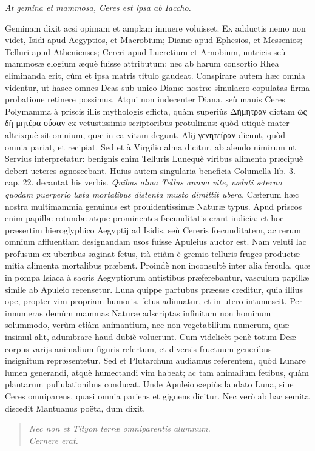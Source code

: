 \documentclass[a4paper, 11pt, oneside, polutonikogreek, latin]{article}
\begin{document}
\emph{At gemina et mammosa, Ceres est ipsa ab Iaccho.}

Geminam dixit acsi opimam et amplam innuere voluisset. Ex adductis nemo non videt, Isidi apud Aegyptios, et Macrobium; Dianæ apud Ephesios, et Messenios; Telluri apud Athenienses; Cereri apud Lucretium et Arnobium, nutricis seù mammosæ elogium æquè fuisse attributum: nec ab harum consortio Rhea eliminanda erit, cùm et ipsa matris titulo gaudeat. Conspirare autem hæc omnia videntur, ut hasce omnes Deas sub unico Dianæ nostræ simulacro copulatas firma probatione retinere possimus. Atqui non indecenter Diana, seù mauis Ceres Polymamma à priscis illis mythologis efficta, quàm superiùs Δήμητραν dictam ὡς δὴ μητέρα οὖσαν ex vetustissimis scriptoribus protulimus: quòd utiquè mater altrixquè sit omnium, quæ in ea vitam degunt. Alij γενητείραν dicunt, quòd omnia pariat, et recipiat. Sed et à Virgilio alma dicitur, ab alendo nimirum ut Servius interpretatur: benignis enim Telluris Lunequè viribus alimenta præcipuè deberi ueteres agnoscebant. Huius autem singularia beneficia Columella lib. 3. cap. 22. decantat his verbis. \emph{Quibus alma Tellus annua vite, væluti æterno quodam puerperio læta mortalibus distenta musto dimittit ubera.} Cæterum hæc nostra multimammia genuinus est prouidentissimæ Naturæ typus. Apud priscos enim papillæ rotundæ atque prominentes fæcunditatis erant indicia: et hoc præsertim hieroglyphico Aegyptij ad Isidis, seù Cereris fœcunditatem, ac rerum omnium affluentiam designandam usos fuisse Apuleius auctor est. Nam veluti lac profusum ex uberibus saginat fetus, ità etiàm è gremio telluris fruges productæ mitia alimenta mortalibus præbent. Proindè non inconsultè inter alia fercula, quæ in pompa Isiaca à sacris Aegyptiorum antistibus præferebantur, vasculum papillæ simile ab Apuleio recensetur. Luna quippe partubus præesse creditur, quia illius ope, propter vim propriam humoris, fetus adiuuatur, et in utero intumescit. Per innumeras demùm mammas Naturæ adscriptas infinitum non hominum solummodo, verùm etiàm animantium, nec non vegetabilium numerum, quæ insimul alit, adumbrare haud dubiè voluerunt. Cum videlicèt penè totum Deæ corpus varijs animalium figuris refertum, et diversis fructuum generibus insignitum repræsentetur. Sed et Plutarchum audiamus referentem, quòd Lunare lumen generandi, atquè humectandi vim habeat; ac tam animalium fetibus, quàm plantarum pullulationibus conducat. Unde Apuleio sæpiùs laudato Luna, siue Ceres omniparens, quasi omnia pariens et gignens dicitur. Nec verò ab hac semita discedit Mantuanus poëta, dum dixit.
\begin{quote}
\emph{Nec non et Tityon terræ omniparentis alumnum.}\\
\emph{Cernere erat.}\\
\end{quote}
\end{document}
